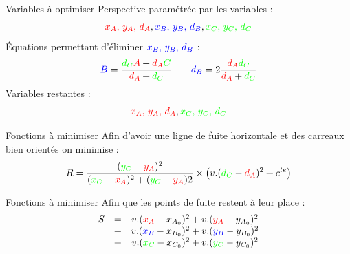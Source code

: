 \documentclass{beamer}
\begin{document}
	\begin{frame}{Variables à optimiser}
		Perspective paramétrée par les variables :
		$$ {\color{red} x_A, \, y_A, \, d_A}, {\color{blue} x_B, \, y_B, \, d_B}, {\color{green} x_C, \, y_C, \, d_C} $$
		Équations permettant d'éliminer $\color{blue} x_B, \, y_B, \, d_B$ :$$ {\color{blue} B} = \dfrac{{\color{green} d_C} {\color{red} A} + {\color{red} d_A} {\color{green} C}}{{\color{red} d_A} + {\color{green} d_C}} \qquad {\color{blue} d_B} = 2 \dfrac{{\color{red} d_A} {\color{green} d_C}}{{\color{red} d_A} + {\color{green} d_C}} $$
		Variables restantes :
		$$ {\color{red} x_A, \, y_A, \, d_A}, {\color{green} x_C, \, y_C, \, d_C} $$
	\end{frame}

	\begin{frame}{Fonctions à minimiser}
		Afin d'avoir une ligne de fuite horizontale et des carreaux bien orientés on minimise :
		$$ R = \dfrac{({\color{green} y_C} - {\color{red} y_A})^2}{({\color{green} x_C} - {\color{red} x_A})^2 + ({\color{green} y_C} - {\color{red} y_A})2} \times \left( v . ({\color{green} d_C} - {\color{red} d_A})^2 + c^{te} \right) $$
	\end{frame}

	\begin{frame}{Fonctions à minimiser}
		Afin que les points de fuite restent à leur place :
		$$ \begin{matrix}
		S & = & v . ({\color{red} x_A} - x_{A_0})^2 + v . ({\color{red} y_A} - y_{A_0})^2 \\
		& + & v . ({\color{blue} x_B} - x_{B_0})^2 + v . ({\color{blue} y_B} - y_{B_0})^2 \\
		& + & v . ({\color{green} x_C} - x_{C_0})^2 + v . ({\color{green} y_C} - y_{C_0})^2
		\end{matrix} $$
	\end{frame}
\end{document}
